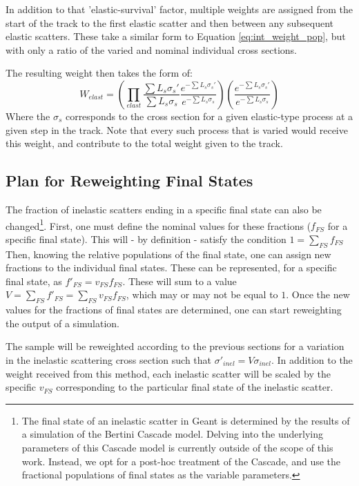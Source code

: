 \documentclass[12pt]{article}
\begin{document}
In addition to that 'elastic-survival' factor, multiple weights are assigned from the start of the track to the first elastic scatter and then between any subsequent elastic scatters. These take a similar form to Equation \ref{eq:int_weight_pop}, but with only a ratio of the varied and nominal individual cross sections.

The resulting weight then takes the form of:
\begin{equation}\label{ref:elastFull}
W_{elast} = (\prod \limits_{elast} \frac{\sum L_s \sigma_s'}{\sum L_s \sigma_s} \frac{e^{-\sum L_s  \sigma_{s}'}}{e^{-\sum L_s  \sigma_{s}}})(\frac{e^{-\sum L_s \sigma_{s}'}}{e^{-\sum L_s \sigma_{s}}})
\end{equation}
Where the $\sigma_s$ corresponds to the cross section for a given elastic-type process at a given step in the track. Note that every such process that is varied would receive this weight, and contribute to the total weight given to the track.

\subsection{Plan for Reweighting Final States}
The fraction of inelastic scatters ending in a specific final state can also be changed\footnote{The final state of an inelastic scatter in Geant is determined by the results of a simulation of the Bertini Cascade model. Delving into the underlying parameters of this Cascade model is currently outside of the scope of this work. Instead, we opt for a post-hoc treatment of the Cascade, and use the fractional populations of final states as the variable parameters.}. First, one must define the nominal values for these fractions ($f_{FS}$ for a specific final state). This will - by definition - satisfy the condition $1 = \sum\limits_{FS} f_{FS}$ Then, knowing the relative populations of the final state, one can assign new fractions to the individual final states. These can be represented, for a specific final state, as $f'_{FS} = v_{FS}f_{FS}$. These will sum to a value $V = \sum\limits_{FS}f'_{FS} = \sum\limits_{FS}v_{FS}f_{FS}$, which may or may not be equal to $1$. Once the new values for the fractions of final states are determined, one can start reweighting the output of a simulation. 

The sample will be reweighted according to the previous sections for a variation in the inelastic scattering cross section such that $\sigma'_{inel} = V\sigma_{inel}$. In addition to the weight received from this method, each inelastic scatter will be scaled by the specific $v_{FS}$ corresponding to the particular final state of the inelastic scatter.
\end{document}
